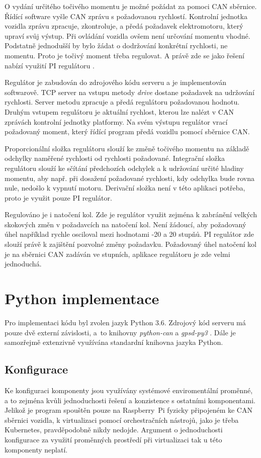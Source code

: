 \documentclass[czech, bachelor]{diploma}
\begin{document}
O vydání určitého točivého momentu je možné požádat za pomoci CAN sběrnice. Řídící software vyšle CAN zprávu s požadovanou
rychlostí. Kontrolní jednotka vozidla zprávu zpracuje, zkontroluje, a předá požadavek elektromotoru, který upraví svůj výstup.
Při ovládání vozidla ovšem není určování momentu vhodné. Podstatně jednodušší by bylo žádat o dodržování konkrétní rychlosti,
ne momentu. Proto je točivý moment třeba regulovat. A právě zde se jako řešení nabízí využití PI regulátoru \cite{
pid-controller-source}.

Regulátor je zabudován do zdrojového kódu serveru a je implementován softwarově. TCP server na vstupu metody \emph{drive} dostane
požadavek na udržování rychlosti. Server metodu zpracuje a předá regulátoru požadovanou hodnotu. Druhým vstupem regulátoru
je aktuální rychlost, kterou lze nalézt v CAN zprávách kontrolní jednotky platformy. Na svém výstupu regulátor vrací požadovaný
moment, který řídící program předá vozidlu pomocí sběrnice CAN.

Proporcionální složka regulátoru slouží ke změně točivého momentu na základě odchylky naměřené rychlosti od rychlosti požadované.
Integrační složka regulátoru slouží ke sčítání předchozích odchylek a k udržování určité hladiny momentu, aby např. při dosažení
požadované rychlosti, kdy odchylka bude rovna nule, nedošlo k vypnutí motoru. Derivační složka není v této aplikaci potřeba, proto
je využit pouze PI regulátor.

Regulováno je i natočení kol. Zde je regulátor využit zejména k zabránění velkých skokových změn v požadavcích na natočení kol.
Není žádoucí, aby požadovaný úhel například rychle osciloval mezi hodnotami -20 a 20 stupňů. PI regulátor zde slouží právě
k zajištění pozvolné změny požadavku. Požadovaný úhel natočení kol je na sběrnici CAN zadáván ve stupních, aplikace regulátoru je
zde velmi jednoduchá.

\section{Python implementace}

Pro implementaci kódu byl zvolen jazyk Python 3.6. Zdrojový kód serveru má pouze dvě externí závislosti, a~to knihovny
\emph{python-can} a \cite{python-can-source} \emph{gpsd-py3} \cite{gpsd-py3-source}. Dále je samozřejmě extenzivně využívána
standardní knihovna jazyka Python.

\subsection{Konfigurace}
Ke konfiguraci komponenty jsou využívány systémové enviromentální proměnné, a to zejména kvůli jednoduchosti řešení a konzistence
s ostatními komponentami. Jelikož je program spouštěn pouze na Raspberry~Pi fyzicky připojeném ke CAN sběrnici vozidla,
k virtualizaci pomocí orchestračních nástrojů, jako je třeba Kubernetes, pravděpodobně nikdy nedojde. Argument o jednoduchosti
konfigurace za využití proměnných prostředí při virtualizaci tak u této komponenty neplatí.
\end{document}
